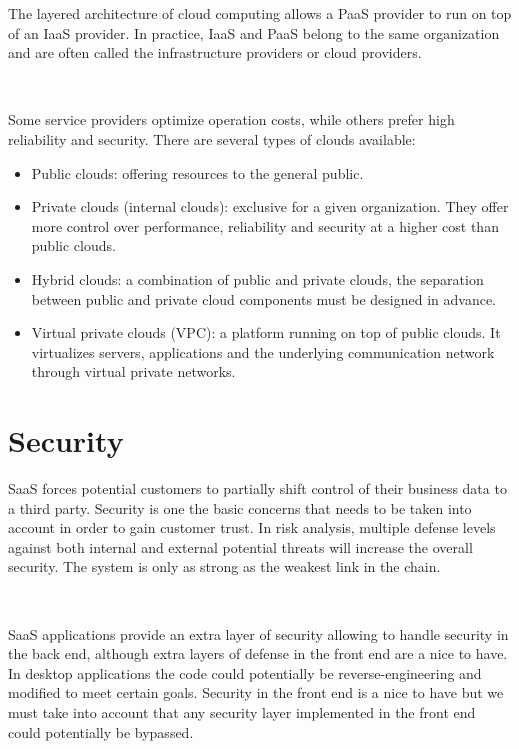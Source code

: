 \documentclass[11pt,english]{article} %
\begin{document}
The layered architecture of cloud computing allows a PaaS provider to run on top of an IaaS provider.
In practice, IaaS and PaaS belong to the same organization and are often called the infrastructure providers or cloud providers\cite{cloud-computing-state-of-the-art}.

\

Some service providers optimize operation costs, while others prefer high reliability and security.
There are several types of clouds available:
\begin{itemize}
    \item Public clouds: offering resources to the general public.
    \item Private clouds (internal clouds): exclusive for a given organization. They offer more control over performance, reliability and security at a higher cost than public clouds.
    \item Hybrid clouds: a combination of public and private clouds, the separation between public and private cloud components must be designed in advance.
    \item Virtual private clouds (VPC): a platform running on top of public clouds. It virtualizes servers, applications and the underlying communication network through virtual private networks.
\end{itemize}


\section{Security}
SaaS forces potential customers to partially shift control of their business data to a third party. Security is one the basic concerns that needs to be taken into account in order to gain customer trust. 
In risk analysis, multiple defense levels against both internal and external potential threats will increase the overall security. The system is only as strong as the weakest link in the chain.

\

SaaS applications provide an extra layer of security allowing to handle security in the back end, although extra layers of defense in the front end are a nice to have.
In desktop applications the code could potentially be reverse-engineering and modified to meet certain goals. %
Security in the front end is a nice to have but we must take into account that any security layer implemented in the front end could potentially be bypassed.
\end{document}
